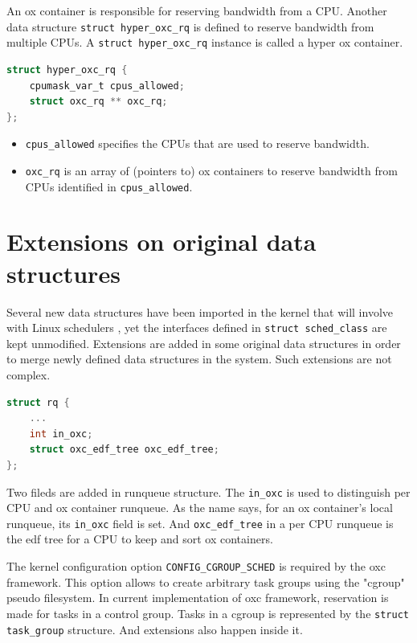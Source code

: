 An ox container is responsible for reserving bandwidth from a CPU.
Another data structure \texttt{struct hyper\_oxc\_rq} is defined to 
reserve bandwidth from multiple CPUs. A \texttt{struct hyper\_oxc\_rq}
instance is called a hyper ox container. 

\begin{lstlisting}[language=C, caption={The hyper ox container}]
struct hyper_oxc_rq {
	cpumask_var_t cpus_allowed;
	struct oxc_rq ** oxc_rq;
};
\end{lstlisting}
\begin{itemize}
\item \texttt{cpus\_allowed} specifies the CPUs that are used to reserve 
				bandwidth.
\item \texttt{oxc\_rq} is an array of (pointers to) ox containers to 
		reserve bandwidth from CPUs identified in 
		\texttt{cpus\_allowed}.
\end{itemize}

\section{Extensions on original data structures\label{sec:extention}}
Several new data structures have been imported in the kernel that will
involve with Linux schedulers , yet the interfaces defined in 
\texttt{struct sched\_class} are kept unmodified. Extensions are added 
in some original data structures in order to merge newly defined data 
structures in the system. Such extensions are not complex.

\begin{lstlisting}[language=C, caption={Extensions on \texttt{struct rq}}]
struct rq {
	...
	int in_oxc;
	struct oxc_edf_tree oxc_edf_tree;
};
\end{lstlisting}
Two fileds are added in runqueue structure. The \texttt{in\_oxc} is 
used to distinguish per CPU and ox container runqueue.
As the name says, for an ox container's local runqueue, its 
\texttt{in\_oxc} field is set. And \texttt{oxc\_edf\_tree} in a 
per CPU runqueue is the edf tree for a CPU to keep and sort ox
containers.

The kernel configuration option \texttt{CONFIG\_CGROUP\_SCHED} is required
by the oxc framework. This option allows to create arbitrary task groups
using the "cgroup" pseudo filesystem. In current implementation of oxc 
framework, reservation is made for tasks in a control group. Tasks in a 
cgroup is represented by the \texttt{struct task\_group} structure. And 
extensions also happen inside it.

